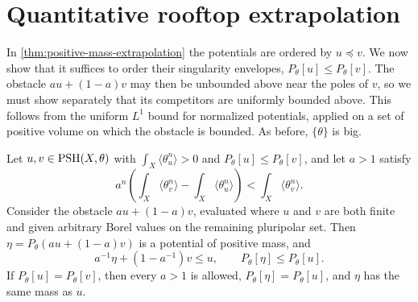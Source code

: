 \section{Quantitative rooftop extrapolation}
\label{sec:quantitative-rooftop-extrapolation}
In \cref{thm:positive-mass-extrapolation} the potentials are ordered by $u\preceq v$. We now show that it suffices to order their singularity envelopes, $P_\theta[u]\leq P_\theta[v]$. The obstacle $au+(1-a)v$ may then be unbounded above near the poles of $v$, so we must show separately that its competitors are uniformly bounded above. This follows from the uniform $L^1$ bound for normalized potentials, applied on a set of positive volume on which the obstacle is bounded. As before, $\{\theta\}$ is big.

\begin{theorem}\label{thm:model-order-rooftop-extrapolation}
Let $u,v\in\mathrm{PSH}(X,\theta)$ with $\int_X\langle\theta_u^n\rangle>0$ and $P_\theta[u]\leq P_\theta[v]$, and let $a>1$ satisfy
\[
 a^n\left(\int_X\langle\theta_v^n\rangle-\int_X\langle\theta_u^n\rangle\right)<\int_X\langle\theta_v^n\rangle.
\]
Consider the obstacle $au+(1-a)v$, evaluated where $u$ and $v$ are both finite and given arbitrary Borel values on the remaining pluripolar set. Then $\eta=P_\theta(au+(1-a)v)$ is a potential of positive mass, and
\[
 a^{-1}\eta+(1-a^{-1})v\leq u,
                   \qquad P_\theta[\eta]\leq P_\theta[u].
\]
If $P_\theta[u]=P_\theta[v]$, then every $a>1$ is allowed, $P_\theta[\eta]=P_\theta[u]$, and $\eta$ has the same mass as $u$.
\end{theorem}
